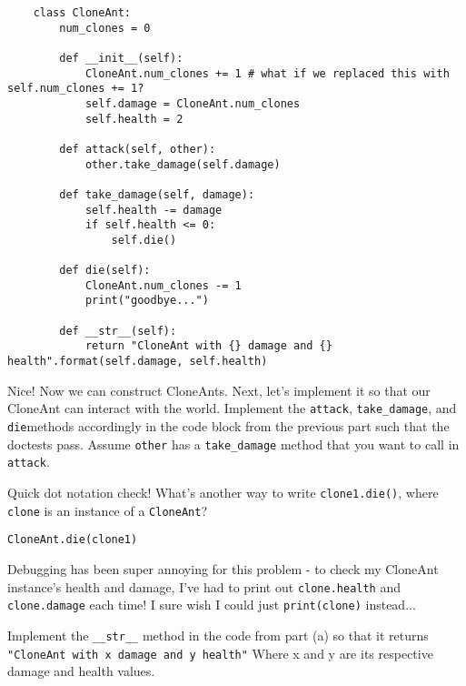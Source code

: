     \begin{solution}
    \begin{lstlisting}
    class CloneAnt:
        num_clones = 0 

        def __init__(self):
            CloneAnt.num_clones += 1 # what if we replaced this with self.num_clones += 1?
            self.damage = CloneAnt.num_clones
            self.health = 2

        def attack(self, other):
            other.take_damage(self.damage)

        def take_damage(self, damage):
            self.health -= damage
            if self.health <= 0:
                self.die()

        def die(self):
            CloneAnt.num_clones -= 1
            print("goodbye...")

        def __str__(self):
            return "CloneAnt with {} damage and {} health".format(self.damage, self.health)
    \end{lstlisting}
    \end{solution}

\question Nice! Now we can construct CloneAnts. Next, let's implement it so that our CloneAnt can interact with the world. 
Implement the \texttt{attack}, \texttt{take\_damage}, and \texttt{die}methods accordingly in the code block from the previous part such that the doctests pass. Assume \texttt{other} has a \texttt{take\_damage} method that you want to call in \texttt{attack}.

Quick dot notation check! What's another way to write \texttt{clone1.die()}, where \texttt{clone} is an instance of a \texttt{CloneAnt}?

\begin{solution}
\begin{lstlisting}
CloneAnt.die(clone1)
\end{lstlisting}
\end{solution}

\question Debugging has been super annoying for this problem - to check my CloneAnt instance's health and damage, I've had to print out \texttt{clone.health} and \texttt{clone.damage} each time! I sure wish I could just \texttt{print(clone)} instead...

Implement the \texttt{\_\_str\_\_} method in the code from part (a) so that it returns \texttt{"CloneAnt with x damage and y health"} Where x and y are its respective damage and health values.

